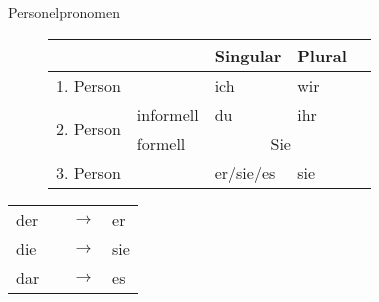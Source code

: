 \begin{syntax}{Personelpronomen}{}
\begin{figure}[H]
\begin{tabular}{|l|l|l|l|l}
	\hline
	\multicolumn{2}{|l|}{} & Singular & Plural \\
	\hline
	\multicolumn{2}{|l|}{1. Person} & ich & wir \\
	\hline
	\multirow{2}{*}{2. Person} & informell & du & ihr \\
	\cline{2-4}
							   & formell & \multicolumn{2}{c|}{Sie} \\
	\hline
	\multicolumn{2}{|l|}{3. Person} & er/sie/es & sie \\
	\hline
\end{tabular}
\end{figure}

\begin{tabular}{llll}
	der & \ssthere & $\rightarrow$ & er \\
	die & \ssthere & $\rightarrow$ & sie \\
	dar & \ssthere & $\rightarrow$ & es \\
\end{tabular}
\end{syntax}

